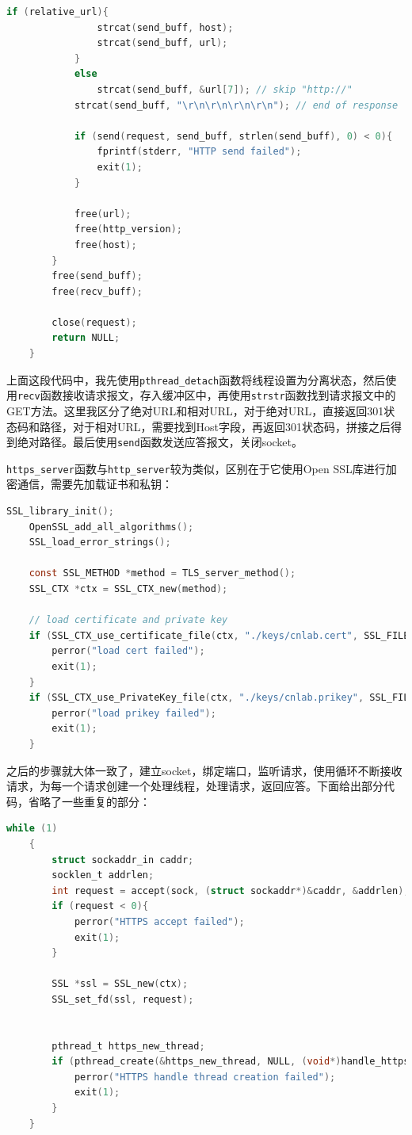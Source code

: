 \documentclass[UTF8]{article}
\begin{document}
\begin{lstlisting}[language=c]
            if (relative_url){
                strcat(send_buff, host);
                strcat(send_buff, url);
            }
            else
                strcat(send_buff, &url[7]); // skip "http://"
            strcat(send_buff, "\r\n\r\n\r\n\r\n"); // end of response
    
            if (send(request, send_buff, strlen(send_buff), 0) < 0){
                fprintf(stderr, "HTTP send failed");
                exit(1);
            }
    
            free(url);
            free(http_version);
            free(host);
        }
        free(send_buff);
        free(recv_buff);
    
        close(request);
        return NULL;
    }
\end{lstlisting} 

上面这段代码中，我先使用\texttt{pthread\_detach}函数将线程设置为分离状态，然后使用\texttt{recv}函数接收请求报文，存入缓冲区中，再使用\texttt{strstr}函数找到请求报文中的GET方法。这里我区分了绝对URL和相对URL，对于绝对URL，直接返回301状态码和路径，对于相对URL，需要找到Host字段，再返回301状态码，拼接之后得到绝对路径。最后使用\texttt{send}函数发送应答报文，关闭socket。

\texttt{https\_server}函数与\texttt{http\_server}较为类似，区别在于它使用Open SSL库进行加密通信，需要先加载证书和私钥：

\begin{lstlisting}[language=c]
    SSL_library_init();
    OpenSSL_add_all_algorithms();
    SSL_load_error_strings();

    const SSL_METHOD *method = TLS_server_method();
    SSL_CTX *ctx = SSL_CTX_new(method);

    // load certificate and private key
    if (SSL_CTX_use_certificate_file(ctx, "./keys/cnlab.cert", SSL_FILETYPE_PEM) <= 0){
        perror("load cert failed");
        exit(1);
    }
    if (SSL_CTX_use_PrivateKey_file(ctx, "./keys/cnlab.prikey", SSL_FILETYPE_PEM) <= 0){
        perror("load prikey failed");
        exit(1);
    }
\end{lstlisting}

之后的步骤就大体一致了，建立socket，绑定端口，监听请求，使用循环不断接收请求，为每一个请求创建一个处理线程，处理请求，返回应答。下面给出部分代码，省略了一些重复的部分：

\begin{lstlisting}[language=c]
    while (1)
    {
        struct sockaddr_in caddr;
        socklen_t addrlen;
        int request = accept(sock, (struct sockaddr*)&caddr, &addrlen);
        if (request < 0){
            perror("HTTPS accept failed");
            exit(1);
        }

        SSL *ssl = SSL_new(ctx);
        SSL_set_fd(ssl, request);


        pthread_t https_new_thread;
        if (pthread_create(&https_new_thread, NULL, (void*)handle_https_request, (void*)&ssl) != 0){
            perror("HTTPS handle thread creation failed");
            exit(1);
        }
    }
\end{lstlisting}
\end{document}
